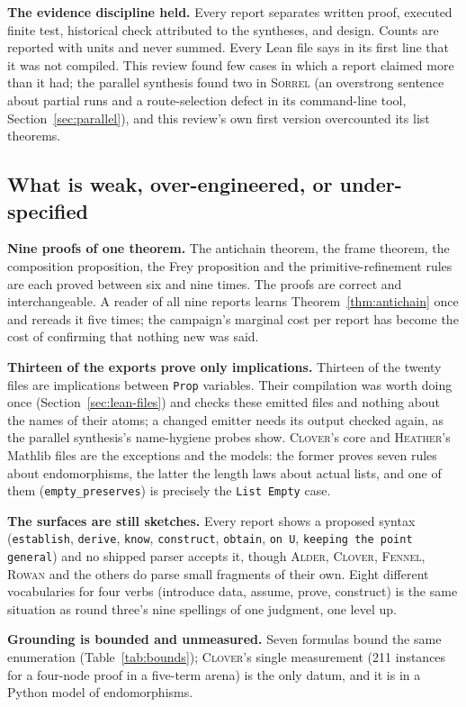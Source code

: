 \documentclass[11pt,a4paper]{article}
\newcommand{\code}[1]{\nolinkurl{#1}}
\newcommand{\Al}{\textsc{Alder}}
\newcommand{\Cl}{\textsc{Clover}}
\newcommand{\Fe}{\textsc{Fennel}}
\newcommand{\He}{\textsc{Heather}}
\newcommand{\Ro}{\textsc{Rowan}}
\newcommand{\So}{\textsc{Sorrel}}
\theoremstyle{definition}
\theoremstyle{plain}
\begin{document}
\textbf{The evidence discipline held.} Every report separates written proof, executed finite test, historical check attributed to the syntheses, and design. Counts are reported with units and never summed. Every Lean file says in its first line that it was not compiled. This review found few cases in which a report claimed more than it had; the parallel synthesis found two in \So{} (an overstrong sentence about partial runs and a route-selection defect in its command-line tool, Section~\ref{sec:parallel}), and this review's own first version overcounted its list theorems.

\subsection{What is weak, over-engineered, or under-specified}
\textbf{Nine proofs of one theorem.} The antichain theorem, the frame theorem, the composition proposition, the Frey proposition and the primitive-refinement rules are each proved between six and nine times. The proofs are correct and interchangeable. A reader of all nine reports learns Theorem~\ref{thm:antichain} once and rereads it five times; the campaign's marginal cost per report has become the cost of confirming that nothing new was said.

\textbf{Thirteen of the exports prove only implications.} Thirteen of the twenty files are implications between \code{Prop} variables. Their compilation was worth doing once (Section~\ref{sec:lean-files}) and checks these emitted files and nothing about the names of their atoms; a changed emitter needs its output checked again, as the parallel synthesis's name-hygiene probes show. \Cl's core and \He's Mathlib files are the exceptions and the models: the former proves seven rules about endomorphisms, the latter the length laws about actual lists, and one of them (\code{empty_preserves}) is precisely the \code{List Empty} case.

\textbf{The surfaces are still sketches.} Every report shows a proposed syntax (\code{establish}, \code{derive}, \code{know}, \code{construct}, \code{obtain}, \code{on U}, \code{keeping the point general}) and no shipped parser accepts it, though \Al, \Cl, \Fe, \Ro{} and the others do parse small fragments of their own. Eight different vocabularies for four verbs (introduce data, assume, prove, construct) is the same situation as round three's nine spellings of one judgment, one level up.

\textbf{Grounding is bounded and unmeasured.} Seven formulas bound the same enumeration (Table~\ref{tab:bounds}); \Cl's single measurement (211 instances for a four-node proof in a five-term arena) is the only datum, and it is in a Python model of endomorphisms.
\end{document}
